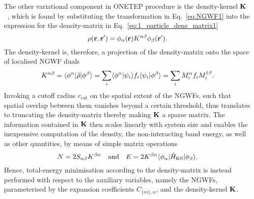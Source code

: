 %


{
The other variational component 
in \textsc{ONETEP} procedure 
is the density-kernel ${\bf K}$~\cite{RevModPhys.32.335}, 
which is found by 
substituting the transformation in 
Eq.~\eqref{eq:NGWF1}
into the expression for the density-matrix 
in Eq.~\eqref{eq:1_particle_dens_matrix1} 
%
\begin{equation}
\rho({\bf r},{\bf r}')=\phi_\alpha({\bf r})K^{\alpha\beta}\phi_\beta({\bf r}'). 
\label{eq:dens_mat_ONETEP}
\end{equation}
%
The density-kernel is, therefore, 
a projection of the density-matrix  
onto the space of localised NGWF duals
%
\begin{equation}
K^{\alpha\beta}=\langle\phi^\alpha\vert\hat{\rho}\vert\phi^\beta\rangle
= \sum_i \langle\phi^\alpha\vert\psi_i\rangle f_i \langle\psi_i\vert\phi^\beta\rangle
= \sum_i M_i^\alpha f_i M_i^{\dagger\beta}.
\end{equation}
%
Invoking a cutoff radius $r_\textrm{cut}$ 
on the spatial extent of the NGWFs, 
such that spatial overlap between them 
vanishes beyond a certain threshold, 
thus translates to truncating the density-matrix 
thereby making $\bf K$ a sparse matrix.
%
The information contained in $\bf K$ 
then scales linearly with system size and 
enables the inexpensive computation 
of the density, 
the {non-interacting band} energy, 
as well as other quantities, 
by means of simple matrix operations
%
\begin{equation}
N=2S_{\alpha\beta}K^{\beta\alpha}
\quad\mbox{and}\quad
E=2K^{\beta\alpha}\langle\phi_\alpha\vert\hat{H}_\textrm{KS}\vert\phi_\beta\rangle.
\label{eq:ONETEP_quantities}
\end{equation}
%
Hence, total-energy minimisation 
according to the density-matrix   
is instead performed with respect to the auxiliary variables, 
namely the NGWFs, 
parameterised by the expansion coefficients $C_{\{m\},\alpha}$, 
and the density-kernel ${\bf K}$.}
%

